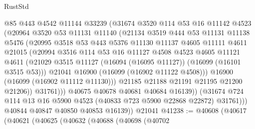 \begin{lexlean}{RustStd}
\begin{coremodule}
                    @85
                    @443
                    @4542
                    @11144
                    @33239
                    (@31674
                      @3520
                      @114
                      @53
                      @16
                      @11142
                      @4523
                      (@20964
                        @3520
                        @53
                        @11131
                        @11140
                        (@21134
                          @3519
                          @444
                          @53
                          @11131
                          @11138
                          @5476
                          (@20995
                            @3518
                            @53
                            @443
                            @5376
                            @11130
                            @11137
                            @4605
                            @11111
                            @4611
                            @21015
                            (@20994
                              @3516
                              @114
                              @53
                              @16
                              @11127
                              @4508
                              @4523
                              @4605
                              @11121
                              @4611
                              (@21029
                                @3515
                                @11127
                                (@16094 (@16095 @11127))
                                (@16099 (@16101 @3515 @53)))
                              @21041
                              @16900
                              (@16099 (@16902 @11122 @4508)))
                            @16900
                            (@16099 (@16902 @11112 @11130)))
                          @21185
                          @21188
                          @21191
                          @21195
                          @21200
                          @21206))
                      @31761)))
                @40675
                @40678
                @40681
                @40684
                @16139))
            (@31674 @724 @114 @13 @16 @5900 @4523 (@40833 @723 @5900 @22868 @22872) @31761)))
        @40844
        @40847
        @40850
        @40853
        @16139))
    @21041
@41238 := @40608
    (@40617
      (@40621
        (@40625
          (@40632
            (@40688
              (@40698
                (@40702

\end{coremodule}
\end{lexlean}
